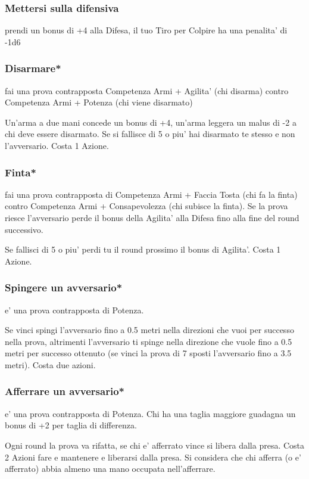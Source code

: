 \documentclass[a4paper,11pt,twoside,openany]{dndbook}
\begin{document}
\subsubsection{Mettersi sulla difensiva} prendi un bonus di +4 alla Difesa, il tuo Tiro per Colpire ha una penalita' di -1d6

\subsubsection{Disarmare*} fai una prova contrapposta Competenza Armi + Agilita' (chi disarma) contro Competenza Armi + Potenza (chi viene disarmato)

Un'arma a due mani concede un bonus di +4, un'arma leggera un malus di -2 a chi deve essere disarmato. Se si fallisce di 5 o piu' hai disarmato te stesso e non l'avversario. Costa 1 Azione.

\subsubsection{Finta*} fai una prova contrapposta di Competenza Armi + Faccia Tosta (chi fa la finta) contro Competenza Armi + Consapevolezza (chi subisce la finta). Se la prova riesce l'avversario perde il bonus della Agilita' alla Difesa fino alla fine del round successivo.

Se fallisci di 5 o piu' perdi tu il round prossimo il bonus di Agilita'.
Costa 1 Azione.

\subsubsection{Spingere un avversario*} e' una prova contrapposta di Potenza.

Se vinci spingi l'avversario fino a 0.5 metri nella direzioni che vuoi per successo nella prova, altrimenti l'avversario ti spinge nella direzione che vuole fino a 0.5 metri per successo ottenuto (se vinci la prova di 7 sposti l'avversario fino a 3.5 metri).
Costa due azioni.

\subsubsection{Afferrare un avversario*} e' una prova contrapposta di Potenza. Chi ha una taglia maggiore guadagna un bonus di +2 per taglia di differenza.

Ogni round la prova va rifatta, se chi e' afferrato vince si libera dalla presa. Costa 2 Azioni fare e mantenere e liberarsi dalla presa. Si considera che chi afferra (o e' afferrato) abbia almeno una mano occupata nell'afferrare.
\end{document}
